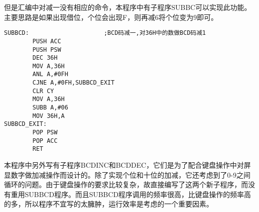但是汇编中对减一没有相应的命令，本程序中有子程序SUBBC可以实现此功能。主要思路是如果出现借位，个位会出现F，则再减6将个位变为9即可。
\begin{lstlisting}[language={[x86masm]assembler},escapeinside="",caption={SUBBCD程序，BCD码减一}] 
		SUBBCD:						;BCD码减一,对36H中的数做BCD码减1
		PUSH ACC
		PUSH PSW
		DEC 36H
		MOV A,36H
		ANL A,#0FH
		CJNE A,#0FH,SUBBCD_EXIT
		CLR CY
		MOV A,36H
		SUBB A,#06
		MOV 36H,A
SUBBCD_EXIT:
		POP PSW
		POP ACC
		RET
\end{lstlisting}

本程序中另外写有子程序BCDINC和BCDDEC，它们是为了配合键盘操作中对屏显数字做加减操作而设计的。除了实现个位和十位的加减，它还考虑到了0-9之间循环的问题。由于键盘操作的要求比较复杂，故直接编写了这两个新子程序，而没有重用SUBBCD程序。而且SUBBCD程序调用的频率很高，比键盘操作的频率高的多，所以程序不宜写的太臃肿，运行效率是考虑的一个重要因素。